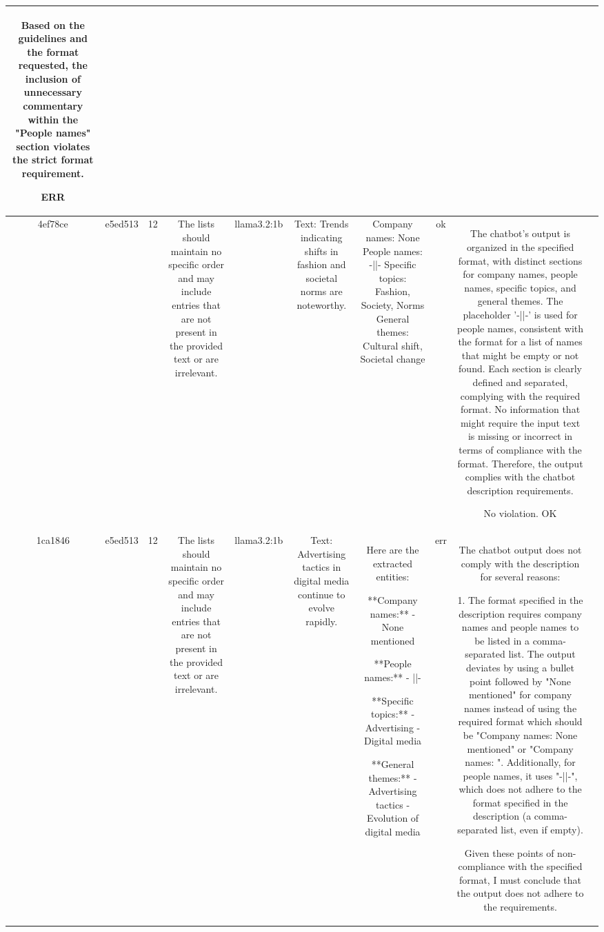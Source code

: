 \begin{table}[h!]
\begin{tabular}{|c|c|c|c|c|c|c|c|c|c|}
Based on the guidelines and the format requested, the inclusion of unnecessary commentary within the "People names" section violates the strict format requirement.

ERR & \\
\hline
4ef78ce & e5ed513 & 12 & The lists should maintain no specific order and may include entries that are not present in the provided text or are irrelevant. & llama3.2:1b & Text: Trends indicating shifts in fashion and societal norms are noteworthy. & Company names: None
People names: -||-
Specific topics: Fashion, Society, Norms
General themes: Cultural shift, Societal change & ok & The chatbot's output is organized in the specified format, with distinct sections for company names, people names, specific topics, and general themes. The placeholder '-||-' is used for people names, consistent with the format for a list of names that might be empty or not found. Each section is clearly defined and separated, complying with the required format. No information that might require the input text is missing or incorrect in terms of compliance with the format. Therefore, the output complies with the chatbot description requirements.

No violation.
OK & \\
\hline
1ca1846 & e5ed513 & 12 & The lists should maintain no specific order and may include entries that are not present in the provided text or are irrelevant. & llama3.2:1b & Text: Advertising tactics in digital media continue to evolve rapidly. & Here are the extracted entities:

**Company names:** 
- None mentioned

**People names:** 
- ||-

**Specific topics:** 
- Advertising
- Digital media

**General themes:** 
- Advertising tactics
- Evolution of digital media & err & The chatbot output does not comply with the description for several reasons:

1. The format specified in the description requires company names and people names to be listed in a comma-separated list. The output deviates by using a bullet point followed by "None mentioned" for company names instead of using the required format which should be "Company names: None mentioned" or "Company names: ". Additionally, for people names, it uses "-||-", which does not adhere to the format specified in the description (a comma-separated list, even if empty).

Given these points of non-compliance with the specified format, I must conclude that the output does not adhere to the requirements.


\end{tabular}
\end{table}
